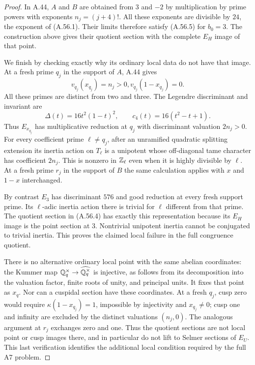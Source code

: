 \begin{proof}
In A.44, $A$ and $B$ are obtained from $3$ and $-2$ by
multiplication by prime powers with exponents
$n_j=(j+4)!$.  All these exponents are divisible by
$24$, the exponent of (A.56.1).  Their limits therefore
satisfy (A.56.5) for $b_0=3$.
The construction above gives their quotient section
with the complete $E_H$ image of that point.

We finish by checking exactly why its ordinary local
data do not have that image.  At a fresh prime $q_j$
in the support of $A$, A.44 gives
\[
                v_{q_j}(x_{q_j})=n_j>0,
                    v_{q_j}(1-x_{q_j})=0.
\tag{A.56.19}
\]
All these primes are distinct from two and three.
The Legendre discriminant and invariant are
\[
       \Delta(t)=16t^2(1-t)^2,\qquad
                    c_4(t)=16(t^2-t+1).
\]
Thus $E_{x_{q_j}}$ has multiplicative reduction at
$q_j$ with discriminant valuation $2n_j>0$.
For every coefficient prime $\ell\ne q_j$, after an
unramified quadratic splitting extension its inertia
action on $T_\ell$ is a unipotent whose off-diagonal
tame character has coefficient $2n_j$.  This is
nonzero in $\mathbb Z_\ell$ even when it is highly divisible
by $\ell$.
At a fresh prime $r_j$ in the support of $B$ the
same calculation applies with $x$ and $1-x$
interchanged.

By contrast $E_3$ has discriminant $576$ and good
reduction at every fresh support prime.  Its
$\ell$-adic inertia action there is trivial for
$\ell$ different from that prime.  The quotient
section in (A.56.4) has exactly this representation
because its $E_H$ image is the point section at $3$.
Nontrivial unipotent inertia cannot be conjugated
to trivial inertia.  This proves the claimed local
failure in the full congruence quotient.

There is no alternative ordinary local point with
the same abelian coordinates: the Kummer map
$\mathbb Q_q^\times\to\widehat{\mathbb Q_q^\times}$ is injective,
as follows from its decomposition into the valuation
factor, finite roots of unity, and principal units.
It fixes that point as $x_q$.  Nor can a cuspidal
section have these coordinates.  At a fresh
$q_j$, cusp zero would require
$\kappa(1-x_{q_j})=1$, impossible by injectivity
and $x_{q_j}\ne0$; cusp one and infinity are
excluded by the distinct valuations $(n_j,0)$.
The analogous argument at $r_j$ exchanges zero
and one.  Thus the quotient sections are not
local point or cusp images there, and in particular
do not lift to Selmer sections of $E_U$.
This last verification identifies the additional
local condition required by the full A7 problem.
\end{proof}

